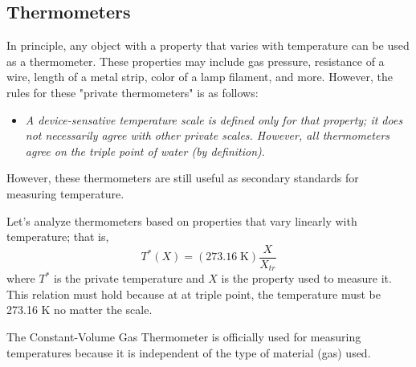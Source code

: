 \documentclass[../PhysicsFormulae.tex]{subfiles}
\begin{document}
\subsection{Thermometers}
In principle, any object with a property that varies with temperature can be used as a thermometer. These properties may include gas pressure, resistance of a wire, length of a metal strip, color of a lamp filament, and more. However, the rules for these "private thermometers" is as follows: 
\begin{itemize}
\item \textit{A device-sensative temperature scale is defined only for that property; it does not necessarily agree with other private scales. However, all thermometers agree on the triple point of water (by definition)}. 
\end{itemize}
However, these thermometers are still useful as secondary standards for measuring temperature. \bigskip

Let's analyze thermometers based on properties that vary linearly with temperature; that is, 
\[ T^{*}(X) = (273.16\;\textrm{K}) \frac{X}{X_{tr}} \]
where $T^{*}$ is the private temperature and $X$ is the property used to measure it. This relation must hold because at at triple point, the temperature must be 273.16 K no matter the scale. \bigskip

The Constant-Volume Gas Thermometer is officially used for measuring temperatures because it is independent of the type of material (gas) used. 
\end{document}
